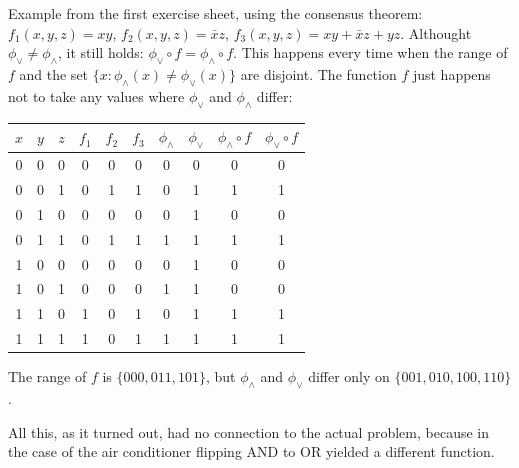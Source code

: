 \documentclass[10pt,a4paper]{scrartcl}
\begin{document}
Example from the first exercise sheet, using the consensus theorem:
$f_1(x,y,z) = x y$, $f_2(x,y,z) = \bar x z$, $f_3(x,y,z) = x y + \bar x z + y z$.
Althought $\phi_\vee \neq \phi_\wedge$, it still holds: 
$\phi_\vee \circ f = \phi_\wedge \circ f$. 
This happens every time when the range of $f$ and the 
set $\{x: \phi_\wedge(x) \neq \phi_\vee(x)\}$ are disjoint. 
The function $f$ just happens not to take any values 
where $\phi_\vee$ and $\phi_\wedge$ differ:

\vspace{0.5 em}
\begin{tabular}{|ccc|ccc|c|c|c|c|}
\hline
$x$ & $y$ & $z$ & $f_1$ & $f_2$ & $f_3$ & $\phi_\wedge$ & $\phi_\vee$ & $\phi_\wedge \circ f$ & $\phi_\vee \circ f$ \\
\hline
0 & 0 & 0 & 0 & 0 & 0 & 0 & 0  & 0 & 0 \\
0 & 0 & 1 & 0 & 1 & 1 & 0 & 1  & 1 & 1 \\
0 & 1 & 0 & 0 & 0 & 0 & 0 & 1  & 0 & 0 \\
0 & 1 & 1 & 0 & 1 & 1 & 1 & 1  & 1 & 1 \\
1 & 0 & 0 & 0 & 0 & 0 & 0 & 1  & 0 & 0 \\
1 & 0 & 1 & 0 & 0 & 0 & 1 & 1  & 0 & 0 \\
1 & 1 & 0 & 1 & 0 & 1 & 0 & 1  & 1 & 1 \\
1 & 1 & 1 & 1 & 0 & 1 & 1 & 1  & 1 & 1 \\
\hline
\end{tabular}

The range of $f$ is $\{000, 011, 101\}$, but $\phi_\wedge$ and $\phi_\vee$ differ only on
$\{001, 010, 100, 110\}$.

All this, as it turned out, had no connection to the actual problem, because in the case of the 
air conditioner flipping AND to OR yielded a different function.
\end{document}
